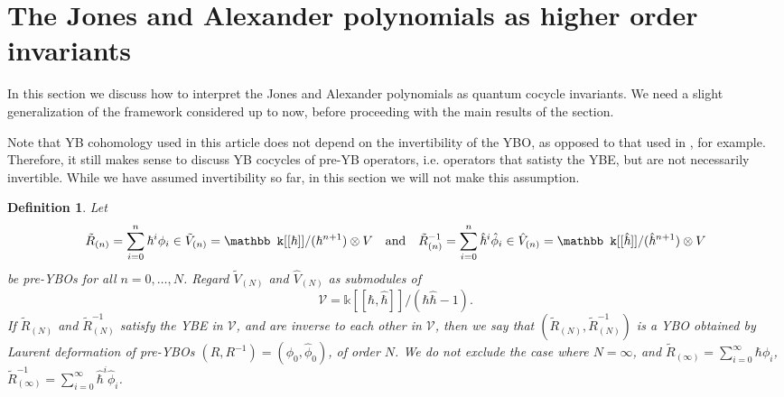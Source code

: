 \documentclass[11pt,fleqn]{amsart} %
\newtheorem{definition}[theorem]{Definition}
\begin{document}
\section{The Jones and Alexander polynomials as higher order  invariants}\label{sec:Jones_Alex}
		
In this section we discuss how to interpret the Jones and Alexander polynomials as quantum cocycle invariants. We need a slight generalization of the framework considered up to now, before proceeding with the main results of the section. 

Note that YB cohomology used in this article does not depend on the invertibility of the YBO, as opposed to that used in \cite{Eis,Eis1}, for example. Therefore, it still makes sense to discuss YB cocycles of pre-YB operators, i.e. operators that satisty the YBE, but are not necessarily invertible. While we have assumed invertibility so far, in this section we will 
not make this assumption.

\begin{definition}\label{def:Laurent}
{\rm
Let 
$$\tilde R_{(n)}=\sum_{i=0}^n \hbar^i \phi_i  \in \tilde V_{(n)} = \mathbb k[[\hbar]]/(\hbar^{ n+1 } ) \otimes  V
\quad {\rm  and} \quad
\tilde R^{-1}_{(n)} = \sum_{i=0}^n \hat\hbar^i \hat \phi_i  \in \hat V_{(n)} = \mathbb k[[\hat \hbar]]/(\hat \hbar^{ n+1}  ) \otimes  V$$
be  pre-YBOs for all $n=0, \ldots, N$.
Regard $\tilde V_{(N)}$ and $\hat V_{(N)}$ as submodules of $$\mathcal V = \mathbb k [[\hbar, \hat \hbar ]]/ (\hbar \hat \hbar -1) .$$ 
If $\tilde R_{(N)}$ and $\tilde R^{-1}_{(N)}$ satisfy the YBE in $\mathcal V$, and are inverse to each other in $\mathcal V$, then we say that 
$(\tilde R_{(N)}, \tilde R^{-1}_{(N)})$ is a YBO obtained by {\it Laurent deformation } of pre-YBOs $(R, R^{-1})=(\phi_0, \hat \phi_0)$, of order $N$. 
We do not exclude the case where $N = \infty$, and $\tilde R_{(\infty)}=\sum_{i=0}^\infty \hbar \phi_i$, $\tilde R^{-1}_{(\infty)} = \sum_{i=0}^\infty \hat\hbar^i \hat \phi_i$. 
}
\end{definition}
\end{document}
